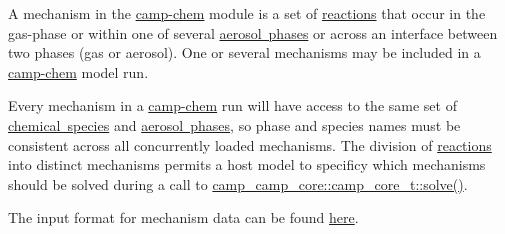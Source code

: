 A mechanism in the \mbox{\hyperlink{index}{camp-\/chem}} module is a set of \mbox{\hyperlink{camp_rxn}{reactions}} that occur in the gas-\/phase or within one of several \mbox{\hyperlink{camp_aero_phase}{aerosol phases}} or across an interface between two phases (gas or aerosol). One or several mechanisms may be included in a \mbox{\hyperlink{index}{camp-\/chem}} model run.

Every mechanism in a \mbox{\hyperlink{index}{camp-\/chem}} run will have access to the same set of \mbox{\hyperlink{camp_species}{chemical species}} and \mbox{\hyperlink{camp_aero_phase}{aerosol phases}}, so phase and species names must be consistent across all concurrently loaded mechanisms. The division of \mbox{\hyperlink{camp_rxn}{reactions}} into distinct mechanisms permits a host model to specificy which mechanisms should be solved during a call to {\ttfamily \mbox{\hyperlink{structcamp__camp__core_1_1camp__core__t_a7579844e73bc39c2fc8ea778d074fcfe}{camp\+\_\+camp\+\_\+core\+::camp\+\_\+core\+\_\+t\+::solve()}}}.

The input format for mechanism data can be found \mbox{\hyperlink{input_format_mechanism}{here}}. 